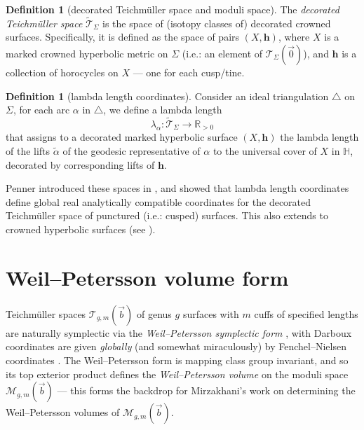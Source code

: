 \documentclass{amsart}
\newcommand{\HH}{\mathbb{H}}
\theoremstyle{definition}
\newtheorem{definition}[proposition]{Definition}
\begin{document}
\begin{definition}[decorated Teichm\"uller space and moduli space]
    The \emph{decorated Teichm\"uller space} $\widetilde{\mathcal{T}}_{\Sigma}$ is the space of (isotopy classes of) decorated crowned surfaces. Specifically, it is defined as the space of pairs $(X,\textbf{h})$, where $X$ is a marked crowned hyperbolic metric on $\Sigma$ (i.e.: an element of $\mathcal{T}_\Sigma(\vec{0})$), and $\textbf{h}$ is a collection of horocycles on $X$ --- one for each cusp/tine.
\end{definition}

\begin{definition}[lambda length coordinates]
Consider an ideal triangulation $\triangle$ on $\Sigma$, for each arc $\alpha$ in $\triangle$, we define a lambda length
\[
\lambda_\alpha:
\widetilde{\mathcal{T}}_{\Sigma}
\rightarrow
\mathbb{R}_{>0}
\]
that assigns to a decorated marked hyperbolic surface $(X,\textbf{h})$ the lambda length of the lifts $\widetilde{\alpha}$ of the geodesic representative of $\alpha$ to the universal cover of $X$ in $\HH$, decorated by corresponding lifts of $\textbf{h}$.
\end{definition}

Penner introduced these spaces in \cite{pennercoords}, and showed that lambda length coordinates define global real analytically compatible coordinates for the decorated Teichm\"uller space of punctured (i.e.: cusped) surfaces. This also extends to crowned hyperbolic surfaces (see \cite[Theorem~2.2.25]{pennerbook}).











\section{Weil--Petersson volume form}
\label{sec:WPvol}

Teichm\"uller spaces $\mathcal{T}_{g,m}(\vec{b})$ of genus $g$ surfaces with $m$ cuffs of specified lengths are naturally symplectic via the \emph{Weil--Petersson symplectic form} \cite{weil}, with Darboux coordinates are given \emph{globally} (and somewhat miraculously) by Fenchel--Nielsen coordinates \cite{wolpertwpform}. The Weil--Petersson form is mapping class group invariant, and so its top exterior product defines the \emph{Weil--Petersson volume} on the moduli space $\mathcal{M}_{g,m}(\vec{b})$ --- this forms the backdrop for Mirzakhani's work on determining the Weil--Petersson volumes of $\mathcal{M}_{g,m}(\vec{b})$.\medskip
\end{document}
